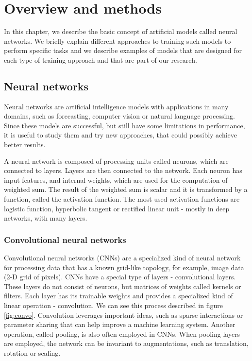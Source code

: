 \chapter{Overview and methods}
\label{chap:overwiev} %
In this chapter, we describe the basic concept of artificial models called neural networks. We briefly explain different approaches to training such models to perform specific tasks and we describe examples of models that are designed for each type of training approach and that are part of our research.

\section{Neural networks} \label{sec:nn}

Neural networks are artificial intelligence models with applications in many domains, such as forecasting, computer vision or natural language processing. Since these models are successful, but still have some limitations in performance, it is useful to study them and try new approaches, that could possibly achieve better results.

A neural network is composed of processing units called neurons, which are connected to layers. Layers are then connected to the network. Each neuron has input features, and internal weights, which are used for the computation of weighted sum. The result of the weighted sum is scalar and it is transformed by a function, called the activation function. The most used activation functions are logistic function, hyperbolic tangent or rectified linear unit - mostly in deep networks, with many layers.

\subsection{Convolutional neural networks}
Convolutional neural networks (CNNs) are a specialized kind of neural network for processing data
that has a known grid-like topology, for example, image data (2-D grid of pixels).
CNNs have a special type of layers - convolutional layers. These layers do not consist of neurons, but matrices of weights called kernels or filters. Each layer has its trainable weights and provides a specialized kind of linear operation - convolution. We can see this process described in figure \ref{fig:convo}. Convolution leverages important ideas, such as sparse interactions or parameter sharing that can help improve a machine learning system. Another operation, called pooling, is also often employed in CNNs. When pooling layers are employed, the network can be invariant to augmentations, such as translation, rotation or scaling. \cite{Goodfellow-et-al-2016} 

